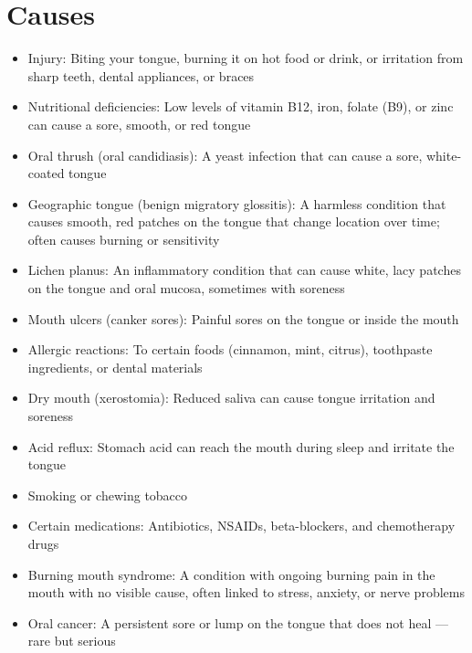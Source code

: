 \section*{Causes}
\begin{itemize}
  \item Injury: Biting your tongue, burning it on hot food or drink, or irritation from sharp teeth, dental appliances, or braces
  \item Nutritional deficiencies: Low levels of vitamin B12, iron, folate (B9), or zinc can cause a sore, smooth, or red tongue
  \item Oral thrush (oral candidiasis): A yeast infection that can cause a sore, white-coated tongue
  \item Geographic tongue (benign migratory glossitis): A harmless condition that causes smooth, red patches on the tongue that change location over time; often causes burning or sensitivity
  \item Lichen planus: An inflammatory condition that can cause white, lacy patches on the tongue and oral mucosa, sometimes with soreness
  \item Mouth ulcers (canker sores): Painful sores on the tongue or inside the mouth
  \item Allergic reactions: To certain foods (cinnamon, mint, citrus), toothpaste ingredients, or dental materials
  \item Dry mouth (xerostomia): Reduced saliva can cause tongue irritation and soreness
  \item Acid reflux: Stomach acid can reach the mouth during sleep and irritate the tongue
  \item Smoking or chewing tobacco
  \item Certain medications: Antibiotics, NSAIDs, beta-blockers, and chemotherapy drugs
  \item Burning mouth syndrome: A condition with ongoing burning pain in the mouth with no visible cause, often linked to stress, anxiety, or nerve problems
  \item Oral cancer: A persistent sore or lump on the tongue that does not heal — rare but serious
\end{itemize}

